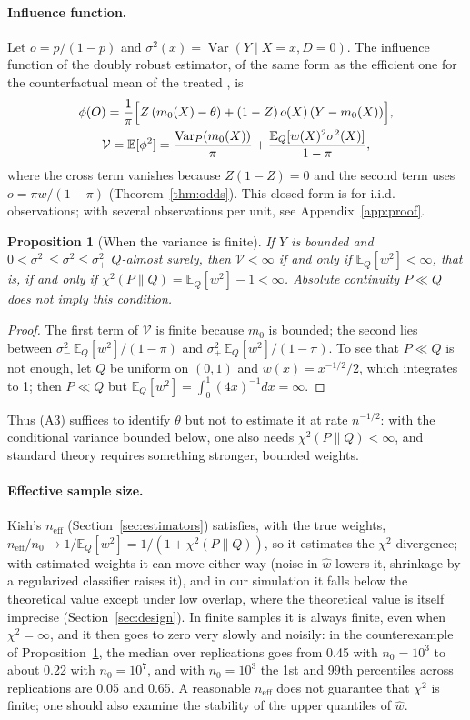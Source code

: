 \documentclass[11pt,a4paper]{article}
\newcommand{\E}{\mathbb{E}}
\newcommand{\Var}{\operatorname{Var}}
\newcommand{\neff}{n_{\mathrm{eff}}}
\theoremstyle{plain}
\newtheorem{proposition}{Proposition}
\theoremstyle{definition}
\begin{document}
\paragraph{Influence function.} Let $o=p/(1-p)$ and $\sigma^2(x)=\Var(Y\mid X=x,D=0)$. The influence function of the doubly robust estimator, of the same form as the efficient one for the counterfactual mean of the treated \citep{hahn1998}, is
\begin{gather*}
\phi(O)=\frac1\pi\Bigl[Z\,(m_0(X)-\theta)+(1-Z)\,o(X)\,(Y-m_0(X))\Bigr],\\
\mathcal V=\E[\phi^2]=\frac{\Var_P(m_0(X))}{\pi}+\frac{\E_Q[w(X)^2\sigma^2(X)]}{1-\pi},
\end{gather*}
where the cross term vanishes because $Z(1-Z)=0$ and the second term uses $o=\pi w/(1-\pi)$ (Theorem~\ref{thm:odds}). This closed form is for i.i.d. observations; with several observations per unit, see Appendix~\ref{app:proof}.

\begin{proposition}[When the variance is finite]\label{prop:variance}
If $Y$ is bounded and $0<\sigma_-^2\le\sigma^2\le\sigma_+^2$ $Q$-almost surely, then $\mathcal V<\infty$ if and only if $\E_Q[w^2]<\infty$, that is, if and only if $\chi^2(P\|Q)=\E_Q[w^2]-1<\infty$. Absolute continuity $P\ll Q$ does not imply this condition.
\end{proposition}
\begin{proof}
The first term of $\mathcal V$ is finite because $m_0$ is bounded; the second lies between $\sigma_-^2\,\E_Q[w^2]/(1-\pi)$ and $\sigma_+^2\,\E_Q[w^2]/(1-\pi)$. To see that $P\ll Q$ is not enough, let $Q$ be uniform on $(0,1)$ and $w(x)=x^{-1/2}/2$, which integrates to 1; then $P\ll Q$ but $\E_Q[w^2]=\int_0^1(4x)^{-1}dx=\infty$.
\end{proof}

Thus (A3) suffices to identify $\theta$ but not to estimate it at rate $n^{-1/2}$: with the conditional variance bounded below, one also needs $\chi^2(P\|Q)<\infty$, and standard theory requires something stronger, bounded weights.

\paragraph{Effective sample size.} Kish's $\neff$ (Section~\ref{sec:estimators}) satisfies, with the true weights, $\neff/n_0\to1/\E_Q[w^2]=1/(1+\chi^2(P\|Q))$, so it estimates the $\chi^2$ divergence; with estimated weights it can move either way (noise in $\hat w$ lowers it, shrinkage by a regularized classifier raises it), and in our simulation it falls below the theoretical value except under low overlap, where the theoretical value is itself imprecise (Section~\ref{sec:design}). In finite samples it is always finite, even when $\chi^2=\infty$, and it then goes to zero very slowly and noisily: in the counterexample of Proposition~\ref{prop:variance}, the median over replications goes from 0.45 with $n_0=10^3$ to about 0.22 with $n_0=10^7$, and with $n_0=10^3$ the 1st and 99th percentiles across replications are 0.05 and 0.65. A reasonable $\neff$ does not guarantee that $\chi^2$ is finite; one should also examine the stability of the upper quantiles of $\hat w$.
\end{document}
